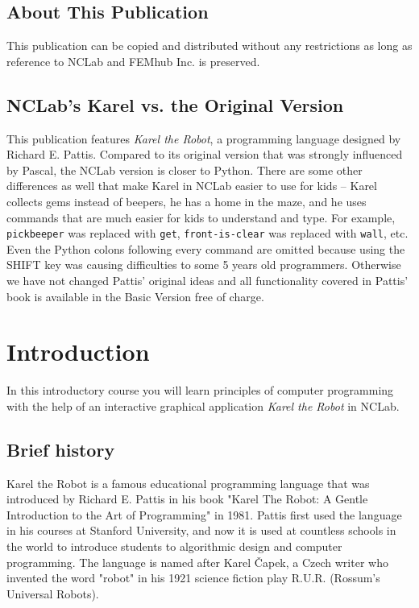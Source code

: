\documentclass[article,A4,12pt]{llncs}
\begin{document}
\subsection*{About This Publication}
This publication can be copied and distributed without any restrictions
as long as reference to NCLab and FEMhub Inc. is preserved.

\subsection*{NCLab's Karel vs. the Original Version}
This publication features {\em Karel the Robot}, a programming language 
designed by Richard E. Pattis. Compared to its original version that was
strongly influenced by Pascal, the NCLab version is closer to Python.
There are some other differences as well that make Karel in NCLab easier to use 
for kids -- Karel collects gems instead of beepers, he has a home in the 
maze, and he uses commands that are much easier for kids to understand
and type. For example, {\tt pickbeeper} was replaced with {\tt get}, 
{\tt front-is-clear} was replaced with {\tt wall}, etc. Even the Python 
colons following every command are omitted because using the SHIFT key 
was causing difficulties to some 5 years old programmers. 
Otherwise we have not changed Pattis' original ideas and all functionality 
covered in Pattis' book is available in the Basic Version free of charge. 

\normalsize

\newpage
\setcounter{tocdepth}{2}
\tableofcontents

\newpage

\pagestyle{plain}
\setcounter{page}{1}


\section{Introduction}

In this introductory course you will learn principles of computer programming with the 
help of an interactive graphical application {\em Karel the Robot} in NCLab. 

\subsection{Brief history}

Karel the Robot is a famous educational programming language that was introduced by Richard E. 
Pattis in his book "Karel The Robot: A Gentle Introduction to the Art of Programming" in 1981. 
Pattis first used the language in his courses at Stanford University, and now it is used at 
countless schools in the world to introduce students to algorithmic design and computer programming. 
The language is named after Karel \v{C}apek, a Czech writer who invented the word "robot" in his 1921 
science fiction play R.U.R. (Rossum's Universal Robots).
\end{document}
